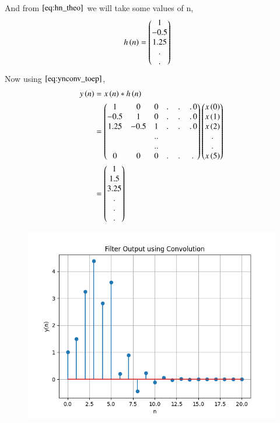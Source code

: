 \documentclass[journal,12pt,twocolumn]{IEEEtran}
\renewcommand\thesection{\arabic{section}}
\begin{document}
\begin{enumerate}[label=\thesection.\arabic*]
\begin{align}
      \end{align}
      And from $\eqref{eq:hn_theo}$ we will take some values of n,
      \begin{align} 
        h\left(n\right) &= \begin{pmatrix}1 \\ -0.5 \\ 1.25 \\. \\ . \end{pmatrix}
      \end{align}
     Now using $\eqref{eq:ynconv_toep}$,
      \begin{align}
        y\left(n\right) &= x\left(n\right)*h\left(n\right)\\
                  &= \begin{pmatrix}1 & 0 & 0 &.\,&.\,&.\,0 \\
                  -0.5 & 1 & 0 & .\,&.\,&.\,0 \\
                  1.25 & -0.5 & 1 & .\,&.\,&.\,0 \\
                   &&..\\&&..\\ 0 & 0 &  0 &.\,&.\,&.\, \end{pmatrix}\begin{pmatrix}x\left(0\right)\\x\left(1\right)\\x\left(2\right)\\ . \\.\\x\left(5\right)\end{pmatrix} \\
                  &= \begin{pmatrix}1\\1.5\\3.25\\.\\.\\.\end{pmatrix}
      \end{align}
      \begin{figure}
        \centering
        \includegraphics[width = \columnwidth]{Figs/ynconv_toeplitz.png}

\end{figure}
\end{enumerate}
\end{document}
